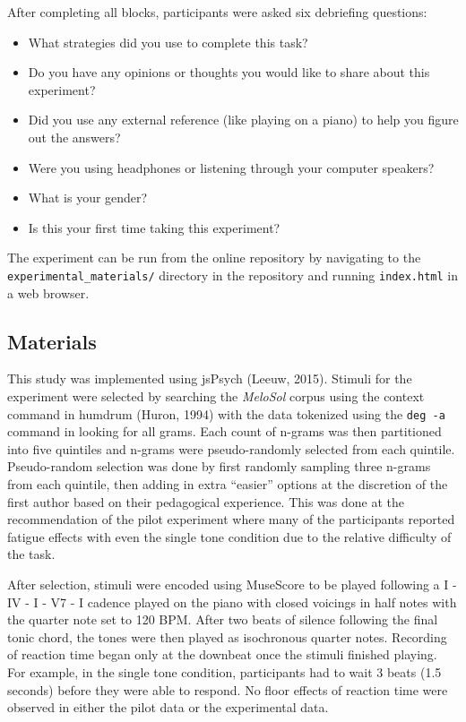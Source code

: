 \documentclass[english,man,floatsintext]{apa6}
\providecommand{\tightlist}{%
  \setlength{\itemsep}{0pt}\setlength{\parskip}{0pt}}
\begin{document}
After completing all blocks, participants were asked six debriefing questions:

\begin{itemize}
\tightlist
\item
  What strategies did you use to complete this task?
\item
  Do you have any opinions or thoughts you would like to share about this experiment?
\item
  Did you use any external reference (like playing on a piano) to help you figure out the answers?
\item
  Were you using headphones or listening through your computer speakers?
\item
  What is your gender?
\item
  Is this your first time taking this experiment?
\end{itemize}

The experiment can be run from the online repository by navigating to the \texttt{experimental\_materials/} directory in the repository and running \texttt{index.html} in a web browser.

\hypertarget{materials}{%
\subsection{Materials}\label{materials}}

This study was implemented using jsPsych (Leeuw, 2015).
Stimuli for the experiment were selected by searching the \emph{MeloSol} corpus using the context command in humdrum (Huron, 1994) with the data tokenized using the \texttt{deg\ -a} command in looking for all grams.
Each count of n-grams was then partitioned into five quintiles and n-grams were pseudo-randomly selected from each quintile.
Pseudo-random selection was done by first randomly sampling three n-grams from each quintile, then adding in extra \enquote{easier} options at the discretion of the first author based on their pedagogical experience.
This was done at the recommendation of the pilot experiment where many of the participants reported fatigue effects with even the single tone condition due to the relative difficulty of the task.

After selection, stimuli were encoded using MuseScore to be played following a I - IV - I - V7 - I cadence played on the piano with closed voicings in half notes with the quarter note set to 120 BPM.
After two beats of silence following the final tonic chord, the tones were then played as isochronous quarter notes.
Recording of reaction time began only at the downbeat once the stimuli finished playing.
For example, in the single tone condition, participants had to wait 3 beats (1.5 seconds) before they were able to respond.
No floor effects of reaction time were observed in either the pilot data or the experimental data.
\end{document}
